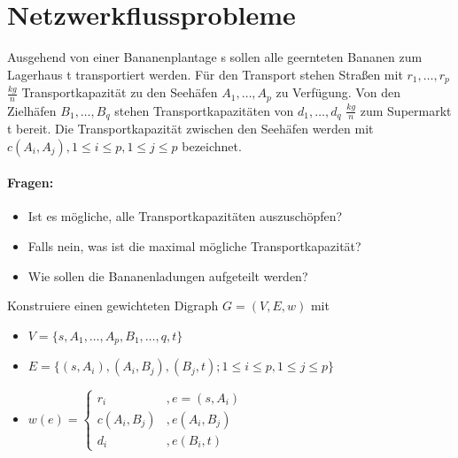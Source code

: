 \section{Netzwerkflussprobleme}
\begin{example}
Ausgehend von einer Bananenplantage s sollen alle geernteten Bananen zum Lagerhaus t transportiert werden. Für den Transport stehen Straßen mit $r_1,\ldots,r_p$ $\frac{kg}{n}$ Transportkapazität zu den Seehäfen $A_1,\ldots,A_p$ zu Verfügung. Von den Zielhäfen $B_1,\ldots,B_q$ stehen Transportkapazitäten von $d_1,\ldots,d_q$ $\frac{kg}{n}$ zum Supermarkt t bereit.
Die Transportkapazität zwischen den Seehäfen werden mit $c(A_i,A_j), 1\le i\le p, 1\le j \le p$ bezeichnet.
\paragraph{Fragen:}
\begin{itemize}
	\item Ist es mögliche, alle Transportkapazitäten auszuschöpfen?
	\item Falls nein, was ist die maximal mögliche Transportkapazität?
	\item Wie sollen die Bananenladungen aufgeteilt werden?
\end{itemize}
Konstruiere einen gewichteten Digraph $G=(V,E,w)$ mit
\begin{itemize}
	\item $V=\{s, A_1,\ldots,A_p, B_1,\ldots,q,t\} $ 
	\item $E= \{(s,A_i), (A_i,B_j), (B_j,t) ; 1\le i\le p, 1\le j\le p\} $ 
	\item $w(e)= \begin{cases}
			r_i &, e=(s,A_i) \\
			c(A_i,B_j) &, e(A_i,B_j) \\
			d_i &, e(B_i,t)
	\end{cases}$ 
\end{itemize}

\begin{center}
\begin{tikzpicture}




\end{tikzpicture}
\end{center}
\end{example}
